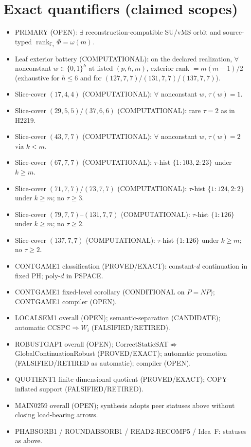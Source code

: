 \documentclass[11pt]{article}
\begin{document}
\section*{Exact quantifiers (claimed scopes)}
\begin{itemize}
\item PRIMARY (OPEN): $\exists$ reconstruction-compatible SU/vMS orbit and source-typed
  $\operatorname{rank}_{\mathbb F_2}\Phi=\omega(m)$.
\item Leaf exterior battery (COMPUTATIONAL): on the declared realization, $\forall$ nonconstant
  $w\in\{0,1\}^h$ at listed $(p,h,m)$, exterior rank $=m(m-1)/2$
  (exhaustive for $h\le6$ and for $(127,7,7)$/$(131,7,7)$/$(137,7,7)$).
\item Slice-cover $(17,4,4)$ (COMPUTATIONAL): $\forall$ nonconstant $w$, $\tau(w)=1$.
\item Slice-cover $(29,5,5)$/$(37,6,6)$ (COMPUTATIONAL): rare $\tau{=}2$ as in H2219.
\item Slice-cover $(43,7,7)$ (COMPUTATIONAL): $\forall$ nonconstant $w$, $\tau(w)=2$ via $k{<}m$.
\item Slice-cover $(67,7,7)$ (COMPUTATIONAL): $\tau$-hist $\{1{:}103,2{:}23\}$ under $k{\ge}m$.
\item Slice-cover $(71,7,7)$/$(73,7,7)$ (COMPUTATIONAL): $\tau$-hist $\{1{:}124,2{:}2\}$ under $k{\ge}m$;
  no $\tau{\ge}3$.
\item Slice-cover $(79,7,7)$--$(131,7,7)$ (COMPUTATIONAL): $\tau$-hist $\{1{:}126\}$ under $k{\ge}m$;
  no $\tau{\ge}2$.
\item Slice-cover $(137,7,7)$ (COMPUTATIONAL): $\tau$-hist $\{1{:}126\}$ under $k{\ge}m$;
  no $\tau{\ge}2$.
\item CONTGAME1 classification (PROVED/EXACT): constant-$d$ continuation in fixed PH;
  poly-$d$ in PSPACE.
\item CONTGAME1 fixed-level corollary (CONDITIONAL on $P=NP$); CONTGAME1 compiler (OPEN).
\item LOCALSEM1 overall (OPEN); semantic-separation (CANDIDATE); automatic CCSPC$\Rightarrow W_i$ (FALSIFIED/RETIRED).
\item ROBUSTGAP1 overall (OPEN); CorrectStaticSAT$\not\Rightarrow$GlobalContinuationRobust (PROVED/EXACT);
  automatic promotion (FALSIFIED/RETIRED as automatic); compiler (OPEN).
\item QUOTIENT1 finite-dimensional quotient (PROVED/EXACT); COPY-inflated support (FALSIFIED/RETIRED).
\item MAIN0259 overall (OPEN); synthesis adopts peer statuses above without closing load-bearing arrows.
\item PHABSORB1 / ROUNDABSORB1 / READ2-RECOMP5 / Idea~F: statuses as above.
\end{itemize}
\end{document}
